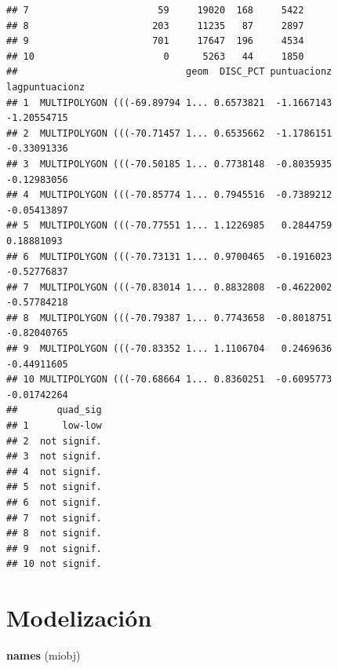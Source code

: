 \documentclass[11pt,]{article}
\newenvironment{Shaded}{\begin{snugshade}}{\end{snugshade}}
\newcommand{\KeywordTok}[1]{\textcolor[rgb]{0.13,0.29,0.53}{\textbf{#1}}}
\newcommand{\NormalTok}[1]{#1}
\begin{document}
\begin{verbatim}
## 7                       59     19020  168     5422
## 8                      203     11235   87     2897
## 9                      701     17647  196     4534
## 10                       0      5263   44     1850
##                              geom  DISC_PCT puntuacionz lagpuntuacionz
## 1  MULTIPOLYGON (((-69.89794 1... 0.6573821  -1.1667143    -1.20554715
## 2  MULTIPOLYGON (((-70.71457 1... 0.6535662  -1.1786151    -0.33091336
## 3  MULTIPOLYGON (((-70.50185 1... 0.7738148  -0.8035935    -0.12983056
## 4  MULTIPOLYGON (((-70.85774 1... 0.7945516  -0.7389212    -0.05413897
## 5  MULTIPOLYGON (((-70.77551 1... 1.1226985   0.2844759     0.18881093
## 6  MULTIPOLYGON (((-70.73131 1... 0.9700465  -0.1916023    -0.52776837
## 7  MULTIPOLYGON (((-70.83014 1... 0.8832808  -0.4622002    -0.57784218
## 8  MULTIPOLYGON (((-70.79387 1... 0.7743658  -0.8018751    -0.82040765
## 9  MULTIPOLYGON (((-70.83352 1... 1.1106704   0.2469636    -0.44911605
## 10 MULTIPOLYGON (((-70.68664 1... 0.8360251  -0.6095773    -0.01742264
##       quad_sig
## 1      low-low
## 2  not signif.
## 3  not signif.
## 4  not signif.
## 5  not signif.
## 6  not signif.
## 7  not signif.
## 8  not signif.
## 9  not signif.
## 10 not signif.
\end{verbatim}

\section{Modelización}\label{modelizaciuxf3n}

\begin{Shaded}
\begin{Highlighting}[]
\KeywordTok{names}\NormalTok{ (miobj)}
\end{Highlighting}
\end{Shaded}
\end{document}
